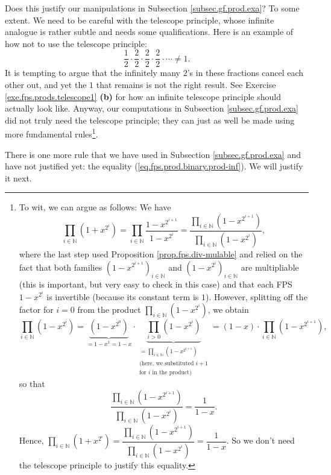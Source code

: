 Does this justify our manipulations in Subsection \ref{subsec.gf.prod.exa}? To
some extent. We need to be careful with the telescope principle, whose
infinite analogue is rather subtle and needs some qualifications. Here is an
example of how not to use the telescope principle:
\[
\dfrac{1}{2}\cdot\dfrac{2}{2}\cdot\dfrac{2}{2}\cdot\dfrac{2}{2}\cdot\cdots
\neq1.
\]
It is tempting to argue that the infinitely many $2$'s in these fractions
cancel each other out, and yet the $1$ that remains is not the right result.
See Exercise \ref{exe.fps.prods.telescope1} \textbf{(b)} for how an infinite
telescope principle should actually look like. Anyway, our computations in
Subsection \ref{subsec.gf.prod.exa} did not truly need the telescope
principle; they can just as well be made using more fundamental
rules\footnote{To wit, we can argue as follows: We have%
\[
\prod_{i\in\mathbb{N}}\left(  1+x^{2^{i}}\right)  =\prod_{i\in\mathbb{N}%
}\dfrac{1-x^{2^{i+1}}}{1-x^{2^{i}}}=\dfrac{\prod_{i\in\mathbb{N}}\left(
1-x^{2^{i+1}}\right)  }{\prod_{i\in\mathbb{N}}\left(  1-x^{2^{i}}\right)  },
\]
where the last step used Proposition \ref{prop.fps.div-mulable} and relied on
the fact that both families $\left(  1-x^{2^{i+1}}\right)  _{i\in\mathbb{N}}$
and $\left(  1-x^{2^{i}}\right)  _{i\in\mathbb{N}}$ are multipliable (this is
important, but very easy to check in this case) and that each FPS $1-x^{2^{i}%
}$ is invertible (because its constant term is $1$). However, splitting off
the factor for $i=0$ from the product $\prod_{i\in\mathbb{N}}\left(
1-x^{2^{i}}\right)  $, we obtain
\[
\prod_{i\in\mathbb{N}}\left(  1-x^{2^{i}}\right)  =\underbrace{\left(
1-x^{2^{0}}\right)  }_{=1-x^{1}=1-x}\cdot\underbrace{\prod_{i>0}\left(
1-x^{2^{i}}\right)  }_{\substack{=\prod_{i\in\mathbb{N}}\left(  1-x^{2^{i+1}%
}\right)  \\\text{(here, we substituted }i+1\\\text{for }i\text{ in the
product)}}}=\left(  1-x\right)  \cdot\prod_{i\in\mathbb{N}}\left(
1-x^{2^{i+1}}\right)  ,
\]
so that%
\[
\dfrac{\prod_{i\in\mathbb{N}}\left(  1-x^{2^{i+1}}\right)  }{\prod
_{i\in\mathbb{N}}\left(  1-x^{2^{i}}\right)  }=\dfrac{1}{1-x}.
\]
Hence, $\prod_{i\in\mathbb{N}}\left(  1+x^{2^{i}}\right)  =\dfrac{\prod
_{i\in\mathbb{N}}\left(  1-x^{2^{i+1}}\right)  }{\prod_{i\in\mathbb{N}}\left(
1-x^{2^{i}}\right)  }=\dfrac{1}{1-x}$. So we don't need the telescope
principle to justify this equality.}.

There is one more rule that we have used in Subsection
\ref{subsec.gf.prod.exa} and have not justified yet: the equality
(\ref{eq.fps.prod.binary.prod-inf}). We will justify it next.

